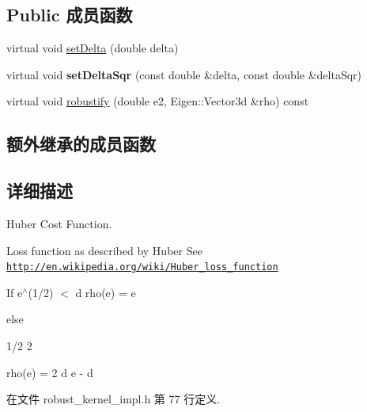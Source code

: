 \subsection*{Public 成员函数}
\begin{DoxyCompactItemize}
\item 
virtual void \hyperlink{classg2o_1_1RobustKernelHuber_a7e9ee4bbc9483dcd3d10a4c1f506a4d2}{set\-Delta} (double delta)
\item 
\hypertarget{classg2o_1_1RobustKernelHuber_ad243b5888d71a3573e9f9372abead870}{virtual void {\bfseries set\-Delta\-Sqr} (const double \&delta, const double \&delta\-Sqr)}\label{classg2o_1_1RobustKernelHuber_ad243b5888d71a3573e9f9372abead870}

\item 
virtual void \hyperlink{classg2o_1_1RobustKernelHuber_a702ac5453740284ba6addeb41157e45e}{robustify} (double e2, Eigen\-::\-Vector3d \&rho) const 
\end{DoxyCompactItemize}
\subsection*{额外继承的成员函数}


\subsection{详细描述}
Huber Cost Function. 

Loss function as described by Huber See \href{http://en.wikipedia.org/wiki/Huber_loss_function}{\tt http\-://en.\-wikipedia.\-org/wiki/\-Huber\-\_\-loss\-\_\-function}

If e$^\wedge$(1/2) $<$ d rho(e) = e

else \begin{DoxyVerb}          1/2    2
\end{DoxyVerb}
 rho(e) = 2 d e -\/ d 

在文件 robust\-\_\-kernel\-\_\-impl.\-h 第 77 行定义.



